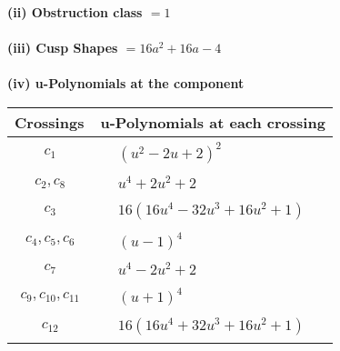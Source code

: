 \documentclass[1p]{elsarticle_modified}
\theoremstyle{definition}
\begin{document}
\flushleft \textbf{(ii) Obstruction class $= 1$}\\~\\
\flushleft \textbf{(iii) Cusp Shapes $= 16 a^2+16 a-4$}\\~\\
\newpage\renewcommand{\arraystretch}{1}
\flushleft \textbf{(iv) u-Polynomials at the component}\newline \\
\begin{tabular}{m{50pt}|m{274pt}}
Crossings & \hspace{64pt}u-Polynomials at each crossing \\
\hline $$\begin{aligned}c_{1}\end{aligned}$$&$\begin{aligned}
&(u^2-2 u+2)^2
\end{aligned}$\\
\hline $$\begin{aligned}c_{2},c_{8}\end{aligned}$$&$\begin{aligned}
&u^4+2 u^2+2
\end{aligned}$\\
\hline $$\begin{aligned}c_{3}\end{aligned}$$&$\begin{aligned}
&16(16 u^4-32 u^3+16 u^2+1)
\end{aligned}$\\
\hline $$\begin{aligned}c_{4},c_{5},c_{6}\end{aligned}$$&$\begin{aligned}
&(u-1)^4
\end{aligned}$\\
\hline $$\begin{aligned}c_{7}\end{aligned}$$&$\begin{aligned}
&u^4-2 u^2+2
\end{aligned}$\\
\hline $$\begin{aligned}c_{9},c_{10},c_{11}\end{aligned}$$&$\begin{aligned}
&(u+1)^4
\end{aligned}$\\
\hline $$\begin{aligned}c_{12}\end{aligned}$$&$\begin{aligned}
&16(16 u^4+32 u^3+16 u^2+1)
\end{aligned}$\\
\hline
\end{tabular}\\~\\
\end{document}
